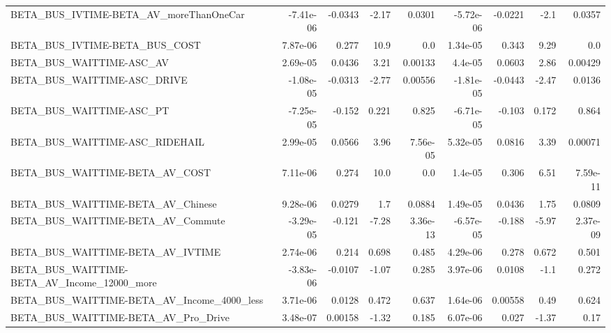 \begin{tabular}{lrrrrrrrr}
BETA\_BUS\_IVTIME-BETA\_AV\_moreThanOneCar             &   -7.41e-06 &      -0.0343 &     -2.17 &   0.0301 &  -5.72e-06 &     -0.0221 &         -2.1 &        0.0357 \\
BETA\_BUS\_IVTIME-BETA\_BUS\_COST                      &    7.87e-06 &        0.277 &      10.9 &      0.0 &   1.34e-05 &       0.343 &         9.29 &           0.0 \\
BETA\_BUS\_WAITTIME-ASC\_AV                           &    2.69e-05 &       0.0436 &      3.21 &  0.00133 &    4.4e-05 &      0.0603 &         2.86 &       0.00429 \\
BETA\_BUS\_WAITTIME-ASC\_DRIVE                        &   -1.08e-05 &      -0.0313 &     -2.77 &  0.00556 &  -1.81e-05 &     -0.0443 &        -2.47 &        0.0136 \\
BETA\_BUS\_WAITTIME-ASC\_PT                           &   -7.25e-05 &       -0.152 &     0.221 &    0.825 &  -6.71e-05 &      -0.103 &        0.172 &         0.864 \\
BETA\_BUS\_WAITTIME-ASC\_RIDEHAIL                     &    2.99e-05 &       0.0566 &      3.96 & 7.56e-05 &   5.32e-05 &      0.0816 &         3.39 &       0.00071 \\
BETA\_BUS\_WAITTIME-BETA\_AV\_COST                     &    7.11e-06 &        0.274 &      10.0 &      0.0 &    1.4e-05 &       0.306 &         6.51 &      7.59e-11 \\
BETA\_BUS\_WAITTIME-BETA\_AV\_Chinese                  &    9.28e-06 &       0.0279 &       1.7 &   0.0884 &   1.49e-05 &      0.0436 &         1.75 &        0.0809 \\
BETA\_BUS\_WAITTIME-BETA\_AV\_Commute                  &   -3.29e-05 &       -0.121 &     -7.28 & 3.36e-13 &  -6.57e-05 &      -0.188 &        -5.97 &      2.37e-09 \\
BETA\_BUS\_WAITTIME-BETA\_AV\_IVTIME                   &    2.74e-06 &        0.214 &     0.698 &    0.485 &   4.29e-06 &       0.278 &        0.672 &         0.501 \\
BETA\_BUS\_WAITTIME-BETA\_AV\_Income\_12000\_more        &   -3.83e-06 &      -0.0107 &     -1.07 &    0.285 &   3.97e-06 &      0.0108 &         -1.1 &         0.272 \\
BETA\_BUS\_WAITTIME-BETA\_AV\_Income\_4000\_less         &    3.71e-06 &       0.0128 &     0.472 &    0.637 &   1.64e-06 &     0.00558 &         0.49 &         0.624 \\
BETA\_BUS\_WAITTIME-BETA\_AV\_Pro\_Drive                &    3.48e-07 &      0.00158 &     -1.32 &    0.185 &   6.07e-06 &       0.027 &        -1.37 &          0.17 \\

\end{tabular}
